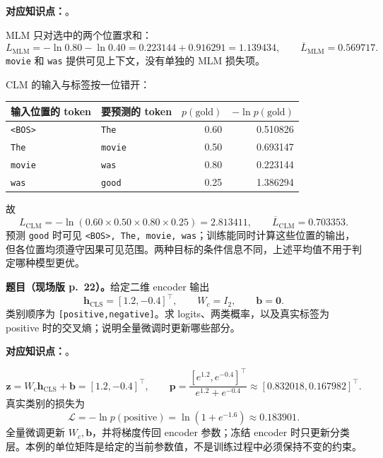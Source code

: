 \textbf{对应知识点：}。

\begin{workedsolution}
MLM 只对选中的两个位置求和：
\[
 L_{\mathrm{MLM}}=-\ln0.80-\ln0.40
 =0.223144+0.916291=\boxed{1.139434},\qquad
 \overline L_{\mathrm{MLM}}=\boxed{0.569717}.
\]
\texttt{movie} 和 \texttt{was} 提供可见上下文，没有单独的 MLM 损失项。

CLM 的输入与标签按一位错开：
\begin{center}
\small
\begin{tabular}{@{}llrr@{}}
\toprule
输入位置的 token & 要预测的 token & $p(\mathrm{gold})$ & $-\ln p(\mathrm{gold})$ \\
\midrule
\texttt{<BOS>} & \texttt{The} & 0.60 & 0.510826 \\
\texttt{The} & \texttt{movie} & 0.50 & 0.693147 \\
\texttt{movie} & \texttt{was} & 0.80 & 0.223144 \\
\texttt{was} & \texttt{good} & 0.25 & 1.386294 \\
\bottomrule
\end{tabular}
\end{center}
故
\[
 L_{\mathrm{CLM}}=-\ln(0.60\times0.50\times0.80\times0.25)
 =\boxed{2.813411},\qquad
 \overline L_{\mathrm{CLM}}=\boxed{0.703353}.
\]
预测 \texttt{good} 时可见 \texttt{<BOS>, The, movie, was}；训练能同时计算这些位置的输出，但各位置均须遵守因果可见范围。两种目标的条件信息不同，上述平均值不用于判定哪种模型更优。
\end{workedsolution}

\nopagebreak[4]
\textbf{题目（现场版 p.~22）。}给定二维 encoder 输出
\[
 \mathbf h_{\mathrm{CLS}}=[1.2,-0.4]^\top,\qquad W_c=I_2,\qquad\mathbf b=\mathbf0.
\]
类别顺序为 \texttt{[positive,negative]}。求 logits、两类概率，以及真实标签为 positive 时的交叉熵；说明全量微调时更新哪些部分。

\textbf{对应知识点：}。

\begin{workedsolution}
\[
 \mathbf z=W_c\mathbf h_{\mathrm{CLS}}+\mathbf b=[1.2,-0.4]^\top,
 \qquad
 \mathbf p=\frac{[e^{1.2},e^{-0.4}]^\top}{e^{1.2}+e^{-0.4}}
 \approx[0.832018,0.167982]^\top.
\]
真实类别的损失为
\[
 \mathcal L=-\ln p(\mathrm{positive})=\ln(1+e^{-1.6})\approx\boxed{0.183901}.
\]
全量微调更新 $W_c,\mathbf b$，并将梯度传回 encoder 参数；冻结 encoder 时只更新分类层。本例的单位矩阵是给定的当前参数值，不是训练过程中必须保持不变的约束。
\end{workedsolution}

